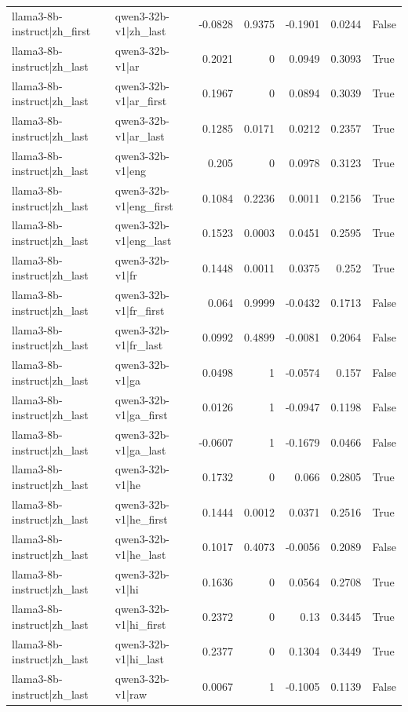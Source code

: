 \begin{table}
\begin{tabular}{l l r r r r l}
llama3-8b-instruct|zh_first & qwen3-32b-v1|zh_last & -0.0828 & 0.9375 & -0.1901 & 0.0244 & False \\
llama3-8b-instruct|zh_last & qwen3-32b-v1|ar & 0.2021 & 0 & 0.0949 & 0.3093 & True \\
llama3-8b-instruct|zh_last & qwen3-32b-v1|ar_first & 0.1967 & 0 & 0.0894 & 0.3039 & True \\
llama3-8b-instruct|zh_last & qwen3-32b-v1|ar_last & 0.1285 & 0.0171 & 0.0212 & 0.2357 & True \\
llama3-8b-instruct|zh_last & qwen3-32b-v1|eng & 0.205 & 0 & 0.0978 & 0.3123 & True \\
llama3-8b-instruct|zh_last & qwen3-32b-v1|eng_first & 0.1084 & 0.2236 & 0.0011 & 0.2156 & True \\
llama3-8b-instruct|zh_last & qwen3-32b-v1|eng_last & 0.1523 & 0.0003 & 0.0451 & 0.2595 & True \\
llama3-8b-instruct|zh_last & qwen3-32b-v1|fr & 0.1448 & 0.0011 & 0.0375 & 0.252 & True \\
llama3-8b-instruct|zh_last & qwen3-32b-v1|fr_first & 0.064 & 0.9999 & -0.0432 & 0.1713 & False \\
llama3-8b-instruct|zh_last & qwen3-32b-v1|fr_last & 0.0992 & 0.4899 & -0.0081 & 0.2064 & False \\
llama3-8b-instruct|zh_last & qwen3-32b-v1|ga & 0.0498 & 1 & -0.0574 & 0.157 & False \\
llama3-8b-instruct|zh_last & qwen3-32b-v1|ga_first & 0.0126 & 1 & -0.0947 & 0.1198 & False \\
llama3-8b-instruct|zh_last & qwen3-32b-v1|ga_last & -0.0607 & 1 & -0.1679 & 0.0466 & False \\
llama3-8b-instruct|zh_last & qwen3-32b-v1|he & 0.1732 & 0 & 0.066 & 0.2805 & True \\
llama3-8b-instruct|zh_last & qwen3-32b-v1|he_first & 0.1444 & 0.0012 & 0.0371 & 0.2516 & True \\
llama3-8b-instruct|zh_last & qwen3-32b-v1|he_last & 0.1017 & 0.4073 & -0.0056 & 0.2089 & False \\
llama3-8b-instruct|zh_last & qwen3-32b-v1|hi & 0.1636 & 0 & 0.0564 & 0.2708 & True \\
llama3-8b-instruct|zh_last & qwen3-32b-v1|hi_first & 0.2372 & 0 & 0.13 & 0.3445 & True \\
llama3-8b-instruct|zh_last & qwen3-32b-v1|hi_last & 0.2377 & 0 & 0.1304 & 0.3449 & True \\
llama3-8b-instruct|zh_last & qwen3-32b-v1|raw & 0.0067 & 1 & -0.1005 & 0.1139 & False \\

\end{tabular}
\end{table}
